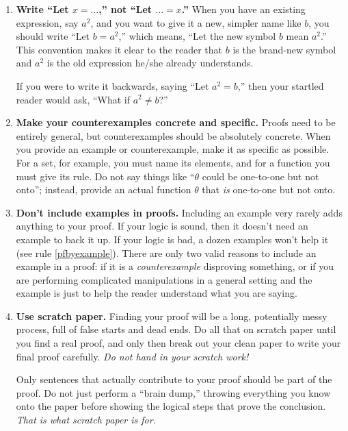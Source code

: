 \begin{enumerate}
\item \textbf{Write ``Let $x=\dots$,'' not ``Let $\dots=x$.''} 
        When you have an existing expression, say $a^{2}$,
        and you want to give it a new, simpler name like $b$,
        you should write ``Let $b=a^{2}$,''
        which means, ``Let the new symbol $b$ mean $a^{2}$.''
        This convention makes it clear to the reader that $b$ is the brand-new symbol
        and $a^{2}$ is the old expression he/she already understands.
        
        If you were to write it backwards, saying ``Let $a^{2}=b$,''
        then your startled reader would ask,
        ``What if $a^{2}\neq b$?''
  
\item \textbf{Make your counterexamples concrete and specific.}
        Proofs need to be entirely general,
        but counterexamples should be absolutely concrete.
        When you provide an example or counterexample,
        make it as specific as possible.
        For a set, for example, you must name its elements,
        and for a function you must give its rule.
        Do not say things like ``$\theta$ could be one-to-one but not onto'';
        instead, provide an actual function $\theta$ that \emph{is} one-to-one but not onto.
    
\item \textbf{Don't include examples in proofs.}
        Including an example very rarely adds anything to your proof.
        If your logic is sound, then it doesn't need an example to back it up.
        If your logic is bad, a dozen examples won't help it (see rule \ref{pfbyexample}).
        There are only two valid reasons to include an example in a proof:
        if it is a \emph{counterexample} disproving something,
        or if you are performing complicated manipulations in a general setting
        and the example is just to help the reader understand what you are saying.

 \item \textbf{Use scratch paper.}
        Finding your proof will be a long, potentially messy process, 
        full of false starts and dead ends.
        Do all that on scratch paper
        until you find a real proof,
        and only then break out your clean paper to write your final proof carefully.
        \emph{Do not hand in your scratch work!}
        
        Only sentences that actually contribute to your proof 
        should be part of the proof.
        Do not just perform a ``brain dump,''
        throwing everything you know onto the paper
        before showing the logical steps that prove the conclusion.
        \emph{That is what scratch paper is for.}

\end{enumerate}